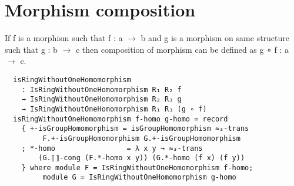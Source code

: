 \section{Morphism composition}
If f is a morphism such that f : a \(\rightarrow\) b and g is a morphism on same structure such that g : b \(\rightarrow\) c then composition of morphism can be defined as g ∘ f : a \(\rightarrow\) c.
\begin{Verbatim}
  isRingWithoutOneHomomorphism
    : IsRingWithoutOneHomomorphism R₁ R₂ f
    → IsRingWithoutOneHomomorphism R₂ R₃ g
    → IsRingWithoutOneHomomorphism R₁ R₃ (g ∘ f)
  isRingWithoutOneHomomorphism f-homo g-homo = record
    { +-isGroupHomomorphism = isGroupHomomorphism ≈₃-trans
		 F.+-isGroupHomomorphism G.+-isGroupHomomorphism
    ; *-homo                 = λ x y → ≈₃-trans 
		(G.⟦⟧-cong (F.*-homo x y)) (G.*-homo (f x) (f y))
    } where module F = IsRingWithoutOneHomomorphism f-homo;
		 module G = IsRingWithoutOneHomomorphism g-homo
\end{Verbatim}


